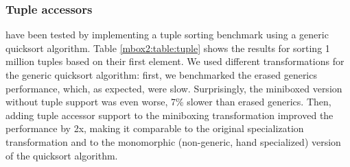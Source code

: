 \subsubsection*{Tuple accessors} have been tested by implementing a tuple sorting benchmark using a generic quicksort algorithm. Table \ref{mbox2:table:tuple} shows the results for sorting 1 million tuples based on their first element. We used different transformations for the generic quicksort algorithm: first, we benchmarked the erased generics performance, which, as expected, were slow. Surprisingly, the miniboxed version without tuple support was even worse, 7\% slower than erased generics. Then, adding tuple accessor support to the miniboxing transformation improved the performance by 2x, making it comparable to the original specialization transformation and to the monomorphic (non-generic, hand specialized) version of the quicksort algorithm.
